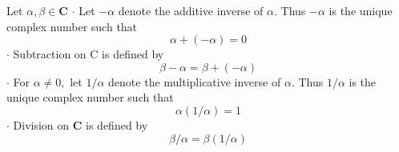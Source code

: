 


Let $\alpha, \beta \in \mathbf{C}$
$\cdot$ Let $-\alpha$ denote the additive inverse of $\alpha .$ Thus $-\alpha$ is the unique complex number such that
$$
\alpha+(-\alpha)=0
$$
$\cdot$ Subtraction on $\mathrm{C}$ is defined by
$$
\beta-\alpha=\beta+(-\alpha)
$$
$\cdot$ For $\alpha \neq 0,$ let $1 / \alpha$ denote the multiplicative inverse of $\alpha .$ Thus $1 / \alpha$ is the unique complex number such that
$$
\alpha(1 / \alpha)=1
$$
$\cdot$ Division on $\mathbf{C}$ is defined by
$$
\beta / \alpha=\beta(1 / \alpha)
$$

